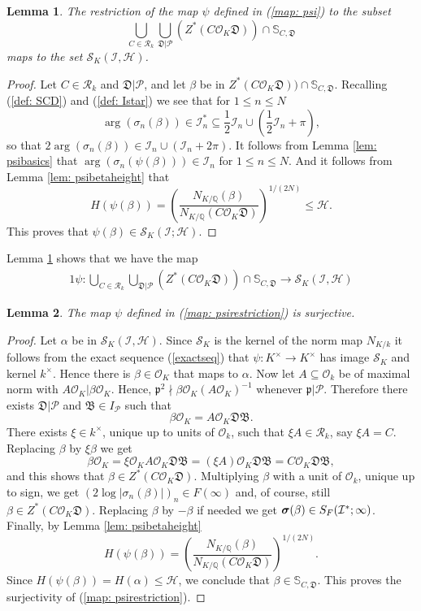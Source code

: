 \documentclass[11pt]{amsart}
\newtheorem{lemma}{Lemma}[section]
\numberwithin{equation}{eqncounter}
\def\IQ{\mathbb Q}
\def\IS{\mathbb S}
\def\Pc{\mathcal{P}}
\def\H{\mathcal{H}}
\def\I{\mathcal{I}}
\def\R{\mathcal{R}}
\def\p{\mathfrak{p}}
\def\B{\mathfrak{B}}
\def\D{\mathfrak{D}}
\def\Zstar{Z^*}
\renewcommand{\vec}[1]{\mbox{\boldmath$#1$}}
\def\Oseen{{\mathcal{O}}}
\def\Sc{\mathcal{S}}
\def\bsigma{{\vec{\sigma}}}
\begin{document}
\begin{lemma}\label{lem: psirestriction}
The restriction of the map $\psi$ defined in  (\ref{map: psi}) to the subset 
$$\bigcup_{C\in \R_k}\bigcup_{\D|\Pc}(\Zstar(C\Oseen_K\D))\cap \IS_{C,\D}$$
maps to the set $\Sc_K(\I,\H)$.
\end{lemma}
\begin{proof}
Let $C\in \R_k$ and $\D|\Pc$, and let $\beta$ be in $\Zstar(C\Oseen_K\D))\cap \IS_{C,\D}$.
Recalling (\ref{def: SCD}) and (\ref{def: Istar}) we see that for $1\leq n\leq N$
$$\arg(\sigma_n(\beta))\in \I^*_n \subseteq \frac{1}{2}\I_n\cup \left(\frac{1}{2}\I_n+\pi\right),$$
so that $2\arg(\sigma_n(\beta))\in \I_n\cup (\I_n+2\pi)$. It follows from
Lemma \ref{lem: psibasics}
that  $\arg(\sigma_n(\psi(\beta)))\in \I_n$ for $1\leq n\leq N$.
And  it follows from Lemma \ref{lem: psibetaheight} that
$$H(\psi(\beta))=\left(\frac{N_{K/\IQ}(\beta)}{N_{K/\IQ}(C\Oseen_K\D)}\right)^{1/(2N)}\leq \H.$$
This proves that $\psi(\beta)\in \Sc_K(\I;\H)$.
\end{proof}

Lemma \ref{lem: psirestriction}
shows that we have the map
\begin{alignat}1\label{map: psirestriction}
\psi:\bigcup_{C\in \R_k}\bigcup_{\D|\Pc}(\Zstar(C\Oseen_K\D))\cap \IS_{C,\D}\to \Sc_K(\I,\H)
\end{alignat}





\begin{lemma}\label{lem: surjective}
The map $\psi$ defined in (\ref{map: psirestriction}) is surjective.
\end{lemma}
\begin{proof}
Let $\alpha$ be in $\Sc_K(\I,\H)$.
Since $\Sc_K$ is the kernel of the norm map $N_{K/k}$ it follows from the exact sequence
(\ref{exactseq}) that
$\psi:K^\times\to K^\times$ has image $\Sc_K$ and kernel $k^\times$. 
Hence there is $\beta\in \Oseen_K$ that maps to $\alpha$.
Now let $A\subseteq \Oseen_k$ be of maximal norm with $A\Oseen_K|\beta\Oseen_K$. Hence, $\p^2\nmid \beta\Oseen_K(A\Oseen_K)^{-1}$ whenever $\p|\Pc$.
Therefore there exists $\D|\Pc$ and $\B\in I_\Pc$ such that 
$$\beta\Oseen_K=A\Oseen_K\D\B.$$
There exists $\xi\in k^\times$, unique up to units of $\Oseen_k$, such that $\xi A\in \R_k$, say $\xi A=C$.
Replacing $\beta$ by $\xi\beta$ we get 
$$\beta\Oseen_K=\xi\Oseen_K A\Oseen_K\D\B=(\xi A)\Oseen_K\D\B=C\Oseen_K\D\B,$$ 
and this shows that
$\beta \in \Zstar(C\Oseen_K\D)$.
Multiplying $\beta$ with a unit of $\Oseen_k$, unique up to sign, we get $(2\log|\sigma_n(\beta)|)_n\in F(\infty)$ and, of course, still $\beta \in \Zstar(C\Oseen_K\D)$.
Replacing $\beta$ by $-\beta$ if needed we get $\bsigma(\beta)\in S_F(\I^*; \infty)$.  
Finally, by Lemma \ref{lem: psibetaheight} 
$$H(\psi(\beta))=\left(\frac{N_{K/\IQ}(\beta)}{N_{K/\IQ}(C\Oseen_K\D)}\right)^{1/(2N)}.$$ Since $H(\psi(\beta))=H(\alpha)\leq \H$,
we conclude that  $\beta\in \IS_{C,\D}$. This proves the surjectivity of (\ref{map: psirestriction}). 
 \end{proof}
\end{document}
